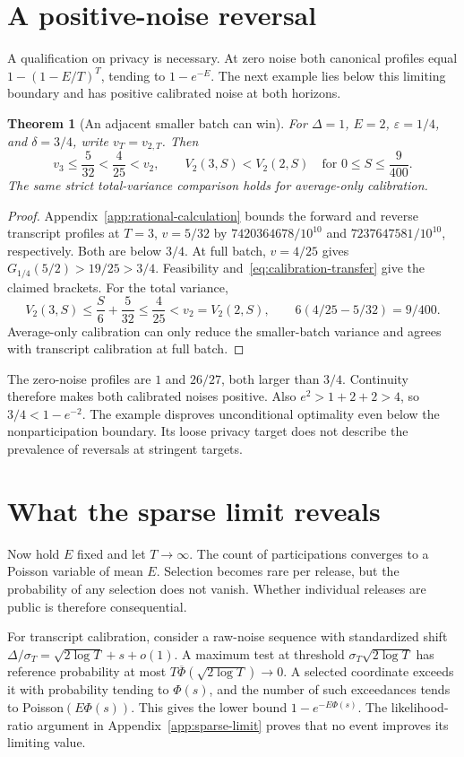\documentclass[11pt]{article}
\newtheorem{theorem}{Theorem}[section]
\theoremstyle{remark}
\begin{document}
\section{A positive-noise reversal}
A qualification on privacy is necessary. At zero noise both canonical
profiles equal $1-(1-E/T)^T$, tending to $1-e^{-E}$. The next example lies
below this limiting boundary and has positive calibrated noise at both horizons.
\begin{theorem}[An adjacent smaller batch can win]\label{thm:strict-interior-counterexample}
For $\Delta=1$, $E=2$, $\varepsilon=1/4$, and $\delta=3/4$, write
$v_T=v_{2,T}$. Then
\[
 v_3\leq\frac5{32}<\frac4{25}<v_2,
 \qquad
 V_2(3,S)<V_2(2,S)\quad\text{for }0\leq S\leq\frac9{400}.
\]
The same strict total-variance comparison holds for average-only calibration.
\end{theorem}
\begin{proof}
Appendix~\ref{app:rational-calculation} bounds the forward and reverse
transcript profiles at $T=3$, $v=5/32$ by
$7420364678/10^{10}$ and $7237647581/10^{10}$, respectively. Both are below
$3/4$. At full batch, $v=4/25$ gives
$G_{1/4}(5/2)>19/25>3/4$. Feasibility and~\eqref{eq:calibration-transfer}
give the claimed brackets. For the total variance,
\[
 V_2(3,S)\leq\frac S6+\frac5{32}\leq\frac4{25}<v_2=V_2(2,S),
 \qquad 6(4/25-5/32)=9/400.
\]
Average-only calibration can only reduce the smaller-batch variance and
agrees with transcript calibration at full batch.
\end{proof}
The zero-noise profiles are $1$ and $26/27$, both larger than $3/4$.
Continuity therefore makes both calibrated noises positive. Also
$e^2>1+2+2>4$, so $3/4<1-e^{-2}$. The example disproves unconditional
optimality even below the nonparticipation boundary. Its loose privacy target
does not describe the prevalence of reversals at stringent targets.

\section{What the sparse limit reveals}\label{sec:sparse}
Now hold $E$ fixed and let $T\to\infty$. The count of participations converges
to a Poisson variable of mean $E$. Selection becomes rare per release, but
the probability of any selection does not vanish. Whether individual releases
are public is therefore consequential.

For transcript calibration, consider a raw-noise sequence with standardized
shift $\Delta/\sigma_T=\sqrt{2\log T}+s+o(1)$. A maximum test at threshold
$\sigma_T\sqrt{2\log T}$ has reference probability at most
$T\overline\Phi(\sqrt{2\log T})\to0$. A selected coordinate exceeds it with
probability tending to $\Phi(s)$, and the number of such exceedances tends
to Poisson$(E\Phi(s))$. This gives the lower bound $1-e^{-E\Phi(s)}$.
The likelihood-ratio argument in Appendix~\ref{app:sparse-limit} proves that
no event improves its limiting value.
\end{document}
